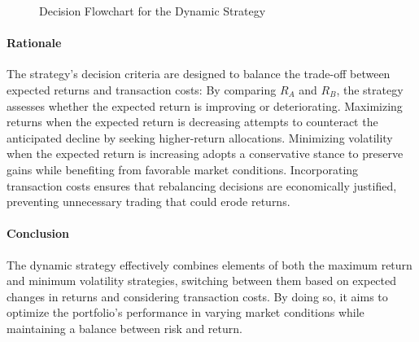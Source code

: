 \begin{figure}[htbp]
{
}
\caption{Decision Flowchart for the Dynamic Strategy}
\end{figure}


\paragraph{Rationale}

The strategy's decision criteria are designed to balance the trade-off between expected returns and transaction costs:
By comparing \( R_A \) and \( R_B \), the strategy assesses whether the expected return is improving or deteriorating.
 Maximizing returns when the expected return is decreasing attempts to counteract the anticipated decline by seeking higher-return allocations.
 Minimizing volatility when the expected return is increasing adopts a conservative stance to preserve gains while benefiting from favorable market conditions.
Incorporating transaction costs ensures that rebalancing decisions are economically justified, preventing unnecessary trading that could erode returns.


\paragraph{Conclusion}

The dynamic strategy effectively combines elements of both the maximum return and minimum volatility strategies, switching between them based on expected changes in returns and considering transaction costs. By doing so, it aims to optimize the portfolio's performance in varying market conditions while maintaining a balance between risk and return.


